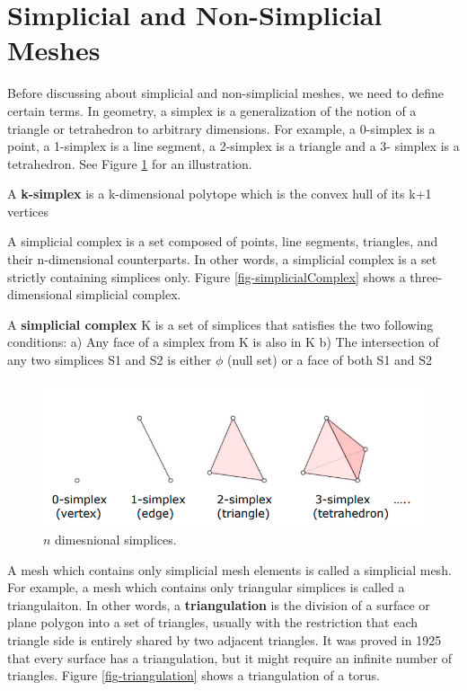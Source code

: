 \section{Simplicial and Non-Simplicial Meshes}
\label{sec-simplicial}

Before discussing about simplicial and non-simplicial meshes, we need to define certain terms. In geometry, a simplex is a generalization of the notion of a triangle or tetrahedron to arbitrary dimensions. For example, a 0-simplex is a point, a 1-simplex is a line segment, a 2-simplex is a triangle and a 3- simplex is a tetrahedron. See Figure \ref{fig-simplices} for an illustration.

\begin{definition}
A \textbf{k-simplex} is a k-dimensional polytope which is the convex hull of its k+1 vertices
\end{definition}

A simplicial complex is a set composed of points, line segments, triangles, and their n-dimensional counterparts. In other words, a simplicial complex is a set strictly containing simplices only. Figure \ref{fig-simplicialComplex} shows a three-dimensional simplicial complex.

\begin{definition}
A \textbf{simplicial complex} K
is a set of simplices that
satisfies the two following
conditions:
a) Any face of a simplex
 from K is also in K
b) The intersection of any
 two simplices S1 and S2
 is either $\phi$ (null set) or a face of
 both S1 and S2
\end{definition}

\begin{figure}
	\centering
	\includegraphics[width=0.95\linewidth]{img/intro/simplices.png}
	\caption{$n$ dimesnional simplices.}
	\label{fig-simplices}
\end{figure}

A mesh which contains only simplicial mesh elements is called a simplicial mesh. For example, a mesh which contains only triangular simplices is called a triangulaiton. In other words, a \textbf{triangulation} is the division of a surface or plane polygon into a set of triangles, usually with the restriction that each triangle side is entirely shared by two adjacent triangles. It was proved in 1925 that every surface has a triangulation, but it might require an infinite number of triangles. Figure \ref{fig-triangulation} shows a triangulation of a torus.

